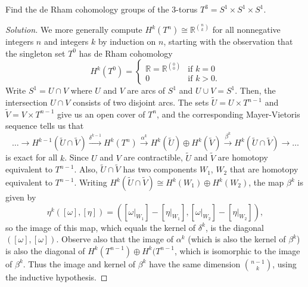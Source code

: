 \documentclass[10pt]{article}
\providecommand{\RR}{\mathbb R}
\newenvironment{soln}{\begin{proof}[Solution]}{\end{proof}}
\begin{document}
\begin{problem}
    Find the de Rham cohomology groups of the $3$-torus
    $T^3 = S^1\times S^1\times S^1$.
\end{problem}

\begin{soln}
    We more generally compute $H^k(T^n)\cong\RR^{\binom nk}$
    for all nonnegative integers $n$ and integers $k$ by induction on $n$,
    starting with the observation that the singleton set $T^0$
    has de Rham cohomology
    \begin{equation*}
        H^k(T^0) = \begin{cases}
	    \RR = \RR^{\binom00} & \text{if }k = 0\\
	    0 & \text{if }k > 0.
        \end{cases}
    \end{equation*}
    Write $S^1 = U\cap V$ where $U$ and $V$ are arcs of $S^1$
    and $U\cup V = S^1$.
    Then, the intersection $U\cap V$ consists of two disjoint arcs.
    The sets $\tilde U = U\times T^{n-1}$ and $\tilde V = V\times T^{n-1}$
    give us an open cover of $T^n$, and the corresponding
    Mayer-Vietoris sequence tells us that
    \begin{equation*}
	\dots\to H^{k-1}(\tilde U\cap\tilde V)
	\overset{\delta^{k-1}}\longrightarrow H^{k}(T^n)
	\overset{\alpha^{k}}\longrightarrow
	H^{k}(\tilde U)\oplus H^{k}(\tilde V)
	\overset{\beta^{k}}\longrightarrow H^{k}(\tilde U\cap\tilde V)
	\to\dots
    \end{equation*}
    is exact for all $k$. Since $U$ and $V$ are contractible,
    $\tilde U$ and $\tilde V$ are homotopy equivalent to $T^{n-1}$.
    Also, $\tilde U\cap\tilde V$ has two components $W_1$, $W_2$
    that are homotopy equivalent to $T^{n-1}$.
    Writing $H^k(\tilde U\cap\tilde V)\cong H^k(W_1)\oplus H^k(W_2)$,
    the map $\beta^k$ is given by
    \begin{equation*}
	\eta^k([\omega],[\eta]) =
	([\omega|_{W_1}] - [\eta|_{W_1}], [\omega|_{W_2}] - [\eta|_{W_2}]),
    \end{equation*}
    so the image of this map, which equals
    the kernel of $\delta^k$, is the diagonal $([\omega],[\omega])$.
    Observe also that the image of $\alpha^k$
    (which is also the kernel of $\beta^k$)
    is also the diagonal of $H^k(T^{n-1})\oplus H^k(T^{n-1}$,
    which is isomorphic to the image of $\beta^k$.
    Thus the image and kernel of $\beta^k$ have the same dimension
    $\binom{n-1}k$, using the inductive hypothesis.


\end{soln}
\end{document}
